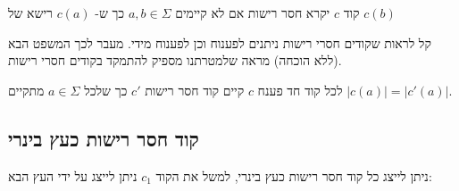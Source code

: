 קוד $c$ יקרא חסר רישות אם לא קיימים
$a,b \in \Sigma$
כך ש-%
$c(a)$
רישא של
$c(b)$

קל לראות שקודים חסרי רישות ניתנים לפענוח וכן לפענוח מידי.
מעבר לכך המשפט הבא (ללא הוכחה) מראה שלמטרתנו מספיק להתמקד בקודים חסרי רישות.
\begin{theorem}
לכל קוד חד פענח $c$ קיים קוד חסר רישות $c'$ כך שלכל 
$a \in \Sigma$
מתקיים
$|c(a)| = |c'(a)|$.
\end{theorem}

\subsection*{קוד חסר רישות כעץ בינרי}
ניתן לייצג כל קוד חסר רישות כעץ בינרי, למשל את הקוד 
$c_1$
ניתן לייצג על ידי העץ הבא:

\begin{center}
\end{center}

